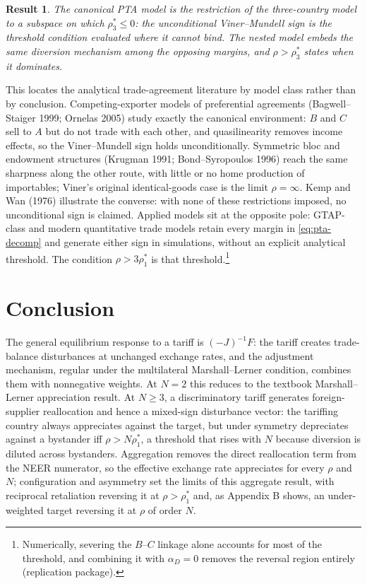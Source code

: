\documentclass[11pt]{article}
\newtheorem{result}{Result}[section]
\begin{document}
\begin{result}
The canonical PTA model is the restriction of the three-country model to a subspace on which $\rho_3^* \leq 0$: the unconditional Viner--Mundell sign is the threshold condition evaluated where it cannot bind. The nested model embeds the same diversion mechanism among the opposing margins, and $\rho > \rho_3^*$ states when it dominates.
\label{res:pta}
\end{result}

\noindent This locates the analytical trade-agreement literature by model class rather than by conclusion. Competing-exporter models of preferential agreements (Bagwell--Staiger 1999; Ornelas 2005) study exactly the canonical environment: $B$ and $C$ sell to $A$ but do not trade with each other, and quasilinearity removes income effects, so the Viner--Mundell sign holds unconditionally. Symmetric bloc and endowment structures (Krugman 1991; Bond--Syropoulos 1996) reach the same sharpness along the other route, with little or no home production of importables; Viner's original identical-goods case is the limit $\rho = \infty$. Kemp and Wan (1976) illustrate the converse: with none of these restrictions imposed, no unconditional sign is claimed. Applied models sit at the opposite pole: GTAP-class and modern quantitative trade models retain every margin in \eqref{eq:pta-decomp} and generate either sign in simulations, without an explicit analytical threshold. The condition $\rho > 3\rho_1^*$ is that threshold.\footnote{Numerically, severing the $B$--$C$ linkage alone accounts for most of the threshold, and combining it with $\alpha_D = 0$ removes the reversal region entirely (replication package).}

\section{Conclusion}

The general equilibrium response to a tariff is $(-J)^{-1}F$: the tariff creates trade-balance disturbances at unchanged exchange rates, and the adjustment mechanism, regular under the multilateral Marshall--Lerner condition, combines them with nonnegative weights. At $N = 2$ this reduces to the textbook Marshall--Lerner appreciation result. At $N \geq 3$, a discriminatory tariff generates foreign-supplier reallocation and hence a mixed-sign disturbance vector: the tariffing country always appreciates against the target, but under symmetry depreciates against a bystander iff $\rho > N\rho_1^*$, a threshold that rises with $N$ because diversion is diluted across bystanders. Aggregation removes the direct reallocation term from the NEER numerator, so the effective exchange rate appreciates for every $\rho$ and $N$; configuration and asymmetry set the limits of this aggregate result, with reciprocal retaliation reversing it at $\rho > \rho_1^*$ and, as Appendix B shows, an under-weighted target reversing it at $\rho$ of order $N$.
\end{document}
